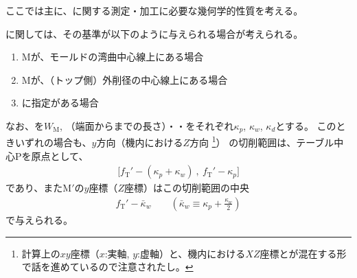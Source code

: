 

ここでは主に、\textbf{\KeywayWidth}に関する測定・加工に必要な幾何学的性質を考える。



\textbf{\Keyway}に関しては、その基準が以下のように与えられる場合が考えられる。
\begin{enumerate}[label=\sarrow]
\item \KeywayCenter Mが、モールドの湾曲中心線上にある場合
\item \KeywayCenter Mが、（トップ側）外削径の中心線上にある場合
\item \AsideKeywayDepth に指定がある場合
\end{enumerate}
なお、\KeywayDiameter を$W_\mathrm M$, \KeywayPos（端面から\Keyway までの長さ）・\KeywayWidth・\AsideKeywayDepth をそれぞれ$\kappa_p$, $\kappa_w$, $\kappa_d$とする。
このときいずれの場合も、$y$方向（機内における$Z$方向
\footnote{計算上の$xy$座標（$x$:実軸, $y$:虚軸）と、機内における$XZ$座標とが混在する形で話を進めているので注意されたし。}）
の切削範囲は、テーブル中心Pを原点として、
\begin{align*}
  \big[f_\mathrm T'-(\kappa_p+\kappa_w)\ ,\ f_\mathrm T'-\kappa_p\big]
\end{align*}
であり、また\KeywayCenter M$'$の$y$座標（$Z$座標）はこの切削範囲の中央
\begin{align}
  \label{eq:mizocenterZ}
  f_\mathrm T'-\bar\kappa_w \qquad
  \left(\bar\kappa_w \equiv \kappa_p+\frac{\kappa_w}2\right)
\end{align}
で与えられる。




